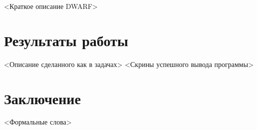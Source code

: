 \documentclass[oneside,senior,etd]{BYUPhys}
\begin{document}
<Краткое описание DWARF>

\section{Результаты работы}

<Описание сделанного как в задачах>
<Скрины успешного вывода программы>

\section{Заключение}

<Формальные слова>

\nocite{arinc, sanitizer, scons, jetos, allocator}


\raggedright




%


\end{document}
